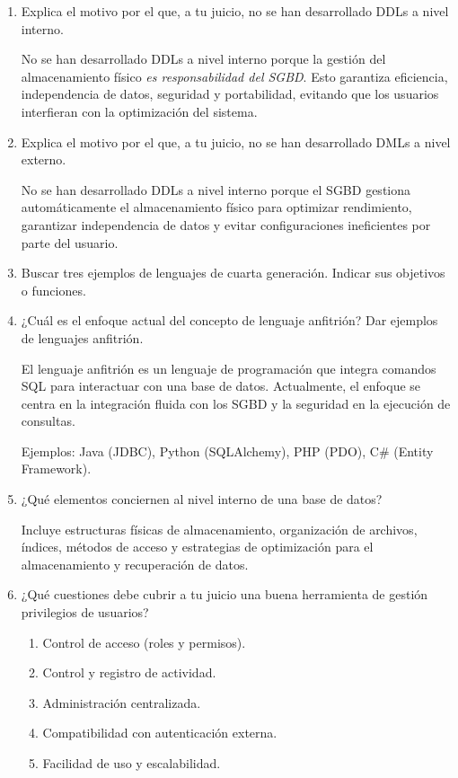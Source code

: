 \begin{enumerate}
    \item Explica el motivo por el que, a tu juicio, no se han desarrollado DDLs a nivel interno.
    

    No se han desarrollado DDLs a nivel interno porque la gestión del almacenamiento físico \textit{es responsabilidad del SGBD}. Esto garantiza eficiencia, independencia de datos, seguridad y portabilidad, evitando que los usuarios interfieran con la optimización del sistema.

    \item Explica el motivo por el que, a tu juicio, no se han desarrollado DMLs a nivel externo.
    
    No se han desarrollado DDLs a nivel interno porque el SGBD gestiona automáticamente el almacenamiento físico para optimizar rendimiento, garantizar independencia de datos y evitar configuraciones ineficientes por parte del usuario.

    \item Buscar tres ejemplos de lenguajes de cuarta generación. Indicar sus objetivos o funciones.
    \item ¿Cuál es el enfoque actual del concepto de lenguaje anfitrión? Dar ejemplos de lenguajes anfitrión.
    
    El lenguaje anfitrión es un lenguaje de programación que integra comandos SQL para interactuar con una base de datos. Actualmente, el enfoque se centra en la integración fluida con los SGBD y la seguridad en la ejecución de consultas.

    Ejemplos: Java (JDBC), Python (SQLAlchemy), PHP (PDO), C\# (Entity Framework).

    \item ¿Qué elementos conciernen al nivel interno de una base de datos?
    
    Incluye estructuras físicas de almacenamiento, organización de archivos, índices, métodos de acceso y estrategias de optimización para el almacenamiento y recuperación de datos.

    \item ¿Qué cuestiones debe cubrir a tu juicio una buena herramienta de gestión privilegios de usuarios?
    
    \begin{enumerate}[label=\alph*)]
        \item Control de acceso (roles y permisos).
        \item Control y registro de actividad.
        \item Administración centralizada.
        \item Compatibilidad con autenticación externa.
        \item Facilidad de uso y escalabilidad.
    \end{enumerate}


\end{enumerate}
